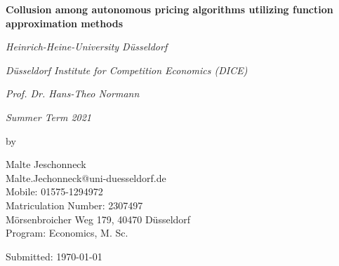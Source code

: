 \documentclass[a4paper]{scrartcl}
\begin{document}
	
	\def\sectionautorefname{section}
	\def\subsectionautorefname{section}
	\def\subsubsectionautorefname{section}
	\def\equationautorefname{equation}
	\def\algorithmautorefname{Algorithm}
	

	
	
	\thispagestyle{empty}
	
	\begin{titlepage}
		\centering
		\vspace{1cm}
		{\Large\bfseries Collusion among autonomous pricing algorithms utilizing function approximation methods\par}
		\vspace{4cm}
		{\large\itshape Heinrich-Heine-University Düsseldorf\par}
		\vspace{0.5cm}
		{\large\itshape Düsseldorf Institute for Competition Economics (DICE)\par}
		\vspace{0.5cm}
		{\large\itshape Prof. Dr. Hans-Theo Normann\par}
		\vspace{0.5cm}
		{\large\itshape Summer Term 2021\par}
		{\large\itshape \par}
		\vfill
		by\par
		\vspace{0.2cm}
		Malte Jeschonneck\\
		Malte.Jechonneck@uni-duesseldorf.de\\
		Mobile: 01575-1294972\\
		Matriculation Number: 2307497\\
		Mörsenbroicher Weg 179, 40470 Düsseldorf\\
		Program: Economics, M. Sc.\\
		
		
		
		\vfill
		
		{\large Submitted: \today\par}
	\end{titlepage}

\restoregeometry %
\end{document}
